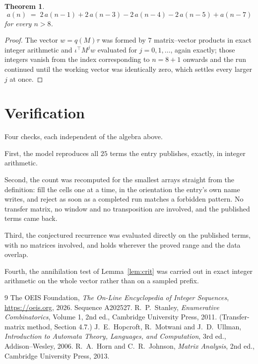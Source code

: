 \documentclass[11pt,a4paper]{article}
\theoremstyle{plain}
\newtheorem{theorem}{Theorem}
\theoremstyle{definition}
\begin{document}
\begin{theorem}
\[
a(n)\;=\;2\,a(n-1) + 2\,a(n-3) - 2\,a(n-4) - 2\,a(n-5) + a(n-7)
\]
for every $n>8$.
\end{theorem}

\begin{proof}
The vector $w=q(M)\tau$ was formed by $7$ matrix--vector products in exact integer
arithmetic and $\iota^{\!\top}M^{j}w$ evaluated for $j=0,1,\dots$, again exactly; those
integers vanish from the index corresponding to $n=8+1$ onwards and the run continued
until the working vector was identically zero, which settles every larger $j$ at once.
\end{proof}

\section{Verification}

Four checks, each independent of the algebra above.

First, the model reproduces all $25$ terms the entry publishes, exactly, in integer
arithmetic.

Second, the count was recomputed for the smallest arrays straight from the definition: fill the
cells one at a time, in the orientation the entry's own name writes, and reject as soon as a
completed run matches a forbidden pattern. No transfer matrix, no window and no transposition
are involved, and the published terms came back.

Third, the conjectured recurrence was evaluated directly on the published terms, with no
matrices involved, and holds wherever the proved range and the data overlap.

Fourth, the annihilation test of Lemma~\ref{lem:crit} was carried out in exact integer
arithmetic on the whole vector rather than on a sampled prefix.

\begin{thebibliography}{9}
 The OEIS Foundation, \emph{The On-Line Encyclopedia of Integer
Sequences}, \url{https://oeis.org}, 2026. Sequence A202527.
 R.~P.~Stanley, \emph{Enumerative Combinatorics}, Volume 1, 2nd ed.,
Cambridge University Press, 2011. (Transfer-matrix method, Section 4.7.)
 J.~E.~Hopcroft, R.~Motwani and J.~D.~Ullman, \emph{Introduction to Automata
Theory, Languages, and Computation}, 3rd ed., Addison--Wesley, 2006.
 R.~A.~Horn and C.~R.~Johnson, \emph{Matrix Analysis}, 2nd ed., Cambridge
University Press, 2013.
\end{thebibliography}
\end{document}
